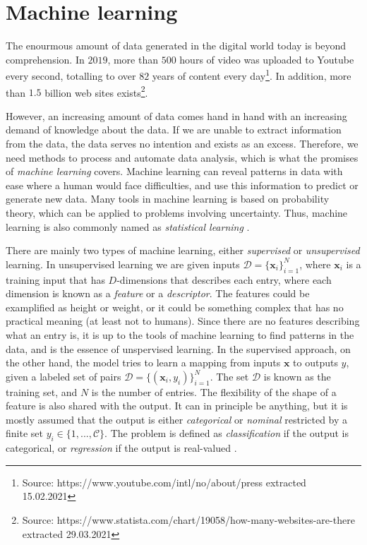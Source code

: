 \chapter{Machine learning}

The enourmous amount of data generated in the digital world today is beyond comprehension. In $2019$, more than $500$ hours of video was uploaded to Youtube every second, totalling to over $82$ years of content every day\footnote{Source: https://www.youtube.com/intl/no/about/press extracted 15.02.2021}. In addition, more than $1.5$ billion web sites exists\footnote{Source: https://www.statista.com/chart/19058/how-many-websites-are-there extracted 29.03.2021}.

However, an increasing amount of data comes hand in hand with an increasing demand of knowledge about the data. If we are unable to extract information from the data, the data serves no intention and exists as an excess. Therefore, we need methods to process and automate data analysis, which is what the promises of \textit{machine learning} covers. Machine learning can reveal patterns in data with ease where a human would face difficulties, and use this information to predict or generate new data. Many tools in machine learning is based on probability theory, which can be applied to problems involving uncertainty. Thus, machine learning is also commonly named as \textit{statistical learning} \cite{Murphy2012}.

There are mainly two types of machine learning, either \textit{supervised} or \textit{unsupervised} learning. In unsupervised learning we are given inputs $\mathcal{D}=\{\boldsymbol{x}_i\}^N_{i=1}$, where $\boldsymbol{x}_i$ is a training input that has $D$-dimensions that describes each entry, where each dimension is known as a \textit{feature} or a \textit{descriptor}. The features could be examplified as height or weight, or it could be something complex that has no practical meaning (at least not to humans). Since there are no features describing what an entry is, it is up to the tools of machine learning to find patterns in the data, and is the essence of unspervised learning. In the supervised approach, on the other hand, the model tries to learn a mapping from inputs $\boldsymbol{x}$ to outputs $y$, given a labeled set of pairs $\mathcal{D}=\{(\boldsymbol{x}_i, y_i)\}^N_{i=1}$. The set $\mathcal{D}$ is known as the training set, and $N$ is the number of entries. The flexibility of the shape of a feature is also shared with the output. It can in principle be anything, but it is mostly assumed that the output is either \textit{categorical} or \textit{nominal} restricted by a finite set $y_i \in \{1,...,\mathcal{C} \}$. The problem is defined as \textit{classification} if the output is categorical, or \textit{regression} if the output is real-valued \cite{Murphy2012}.

